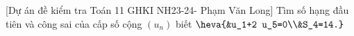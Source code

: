 \begin{bt}%
[Dự án đề kiểm tra Toán 11 GHKI NH23-24- Phạm Văn Long]%
	Tìm số hạng đầu tiên và công sai của cấp số cộng $(u_n)$ biết $\heva{&u_1+2 u_5=0\\&S_4=14.}$
\end{bt}

